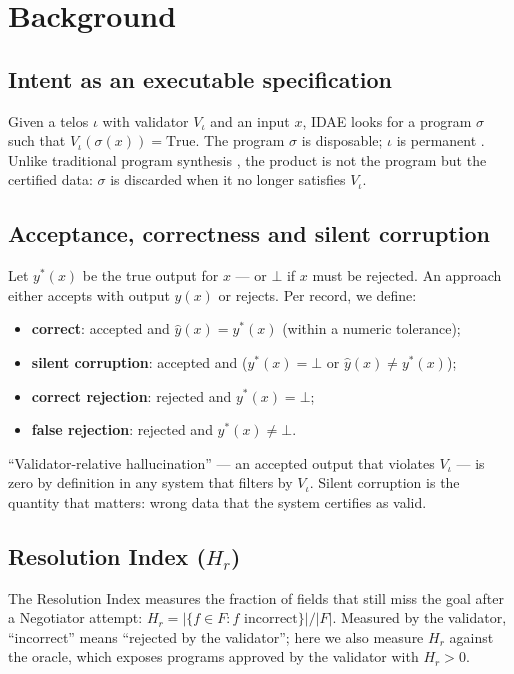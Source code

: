 \documentclass[sigconf,nonacm]{acmart}
\begin{document}
\section{Background}
\label{sec:fund}

\subsection{Intent as an executable specification}

Given a telos $\iota$ with validator $V_\iota$ and an input $x$, IDAE looks for a program $\sigma$ such that $V_\iota(\sigma(x)) = \text{True}$. The program $\sigma$ is disposable; $\iota$ is permanent \cite{astrom1995adaptive,liskov2000program}. Unlike traditional program synthesis \cite{gulwani2017program}, the product is not the program but the certified data: $\sigma$ is discarded when it no longer satisfies $V_\iota$.

\subsection{Acceptance, correctness and silent corruption}

Let $y^\ast(x)$ be the true output for $x$ --- or $\bot$ if $x$ must be rejected. An approach either accepts with output $\hat{y}(x)$ or rejects. Per record, we define:

\begin{itemize}
\item \textbf{correct}: accepted and $\hat{y}(x) = y^\ast(x)$ (within a numeric tolerance);
\item \textbf{silent corruption}: accepted and ($y^\ast(x) = \bot$ or $\hat{y}(x) \neq y^\ast(x)$);
\item \textbf{correct rejection}: rejected and $y^\ast(x) = \bot$;
\item \textbf{false rejection}: rejected and $y^\ast(x) \neq \bot$.
\end{itemize}

``Validator-relative hallucination'' --- an accepted output that violates $V_\iota$ --- is zero by definition in any system that filters by $V_\iota$. Silent corruption is the quantity that matters: wrong data that the system certifies as valid.

\subsection{Resolution Index ($H_r$)}

The Resolution Index measures the fraction of fields that still miss the goal after a Negotiator attempt: $H_r = |\{f \in F : f \text{ incorrect}\}| / |F|$. Measured by the validator, ``incorrect'' means ``rejected by the validator''; here we also measure $H_r$ against the oracle, which exposes programs approved by the validator with $H_r > 0$.
\end{document}
